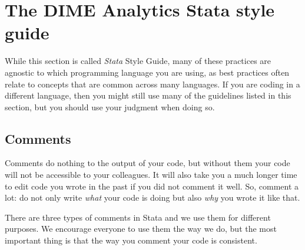 \section{The DIME Analytics Stata style guide}

While this section is called \textit{Stata} Style Guide, many of these practices are agnostic to which
programming language you are using, as best practices often relate to concepts that are common across many
languages. If you are coding in a different language, then you might still use many of the guidelines
listed in this section, but you should use your judgment when doing so.

\subsection{Comments}

Comments do nothing to the output of your code, but without them your code will not be accessible to your colleagues.
It will also take you a much longer time to edit code you wrote in the past if you did not comment it well.
So, comment a lot: do not only write \textit{what} your code is doing but also \textit{why} you wrote it like that.

There are three types of comments in Stata and we use them for different purposes.
 We encourage everyone to use them the way we do,
 but the most important thing is that the way you comment your code is consistent.



\mainmatter

